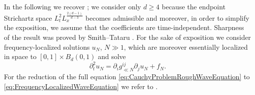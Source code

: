 \documentclass{amsart}
\theoremstyle{definition}
\begin{document}
In the following we recover \cite[Theorem~4]{Tataru2001}; we consider only $d \geq 4$ because the endpoint Strichartz space $L_t^2 L_x^{\frac{2(d-1)}{d-3}}$ becomes admissible and moreover, in order to simplify the exposition, we assume that the coefficients are  time-independent. Sharpness of the result was proved by Smith--Tataru \cite{SmithTataru2002}. For the sake of exposition we consider frequency-localized solutions $u_N$, $N \gg 1$, which are moreover essentially localized in space to $[0,1] \times B_d(0,1)$ and solve
\begin{equation}
\label{eq:FrequencyLocalizedWaveEquation}
    \partial_t^2 u_N = \partial_i g^{ij}_{\ll N} \partial_j u_N + f_N.
\end{equation}
For the reduction of the full equation \eqref{eq:CauchyProblemRoughWaveEquation} to \eqref{eq:FrequencyLocalizedWaveEquation} we refer to \cite[pp.~415--417]{Tataru2001}.
\end{document}
